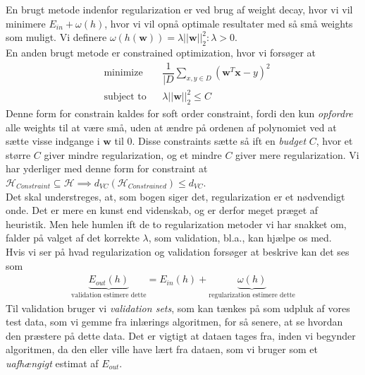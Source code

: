 \documentclass[paper=a4, fontsize=11pt]{scrartcl} %
\numberwithin{equation}{section} %
\numberwithin{figure}{section} %
\numberwithin{table}{section} %
\begin{document}
	 En brugt metode indenfor regularization er ved brug af weight decay, hvor vi vil minimere $E_{in}+\omega(h)$, hvor vi vil opnå optimale resultater med så små weights som muligt. Vi definere $\omega(h(\mathbf{w}))=\lambda||\mathbf{w}||_2^2: \lambda>0$. \\
	 
	 En anden brugt metode er constrained optimization, hvor vi forsøger at 
	 \begin{align*}
	 &\text{minimize} &&\dfrac{1}{|D}\sum_{x,y\in D}(\mathbf{w}^T\mathbf{x}-y)^2 \\
	 &\text{subject to} &&\lambda||\mathbf{w}||^2_2\leq C
	 \end{align*}
	Denne form for constrain kaldes for soft order constraint, fordi den kun \textit{opfordre} alle weights til at være små, uden at ændre på ordenen af polynomiet ved at sætte visse indgange i $\mathbf{w}$ til $0$. Disse constraints sætte så ift en \textit{budget} $C$, hvor et større $C$ giver mindre regularization, og et mindre $C$ giver mere regularization. Vi har yderliger med denne form for constraint at $\mathcal{H}_{Constraint}\subseteq \mathcal{H} \implies d_{VC}(\mathcal{H}_{Constrained}) \leq d_{VC}$. \\
	
	Det skal understreges, at, som bogen siger det, regularization er et nødvendigt onde. Det er mere en kunst end videnskab, og er derfor meget præget af heuristik. Men hele humlen ift de to regularization metoder vi har snakket om, falder på valget af det korrekte $\lambda$, som validation, bl.a., kan hjælpe os med. \\
	
	Hvis vi ser på hvad regularization og validation forsøger at beskrive kan det ses som
	\begin{align*}
	\underbrace{E_{out}(h)}_{\text{validation estimere dette}}=E_{in}(h)+\underbrace{\omega(h)}_{\text{regularization estimere dette}}
	\end{align*}
	Til validation bruger vi \textit{validation sets}, som kan tænkes på som udpluk af vores test data, som vi gemme fra inlærings algoritmen, for så senere, at se hvordan den præstere på dette data. Det er vigtigt at dataen tages fra, inden vi begynder algoritmen, da den eller ville have lært fra dataen, som vi bruger som et \textit{uafhængigt} estimat af $E_{out}$. \\
	
\end{document}
